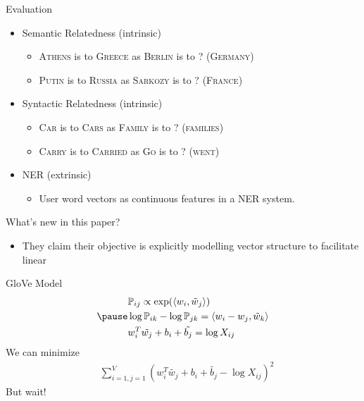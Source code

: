 \begin{frame}{Evaluation}
  \begin{itemize}
  \item Semantic Relatedness (intrinsic)
    \begin{itemize}
    \item \textsc{Athens} is to \textsc{Greece} as \textsc{Berlin} is to ? (\textsc{Germany})
    \item \textsc{Putin} is to \textsc{Russia} as \textsc{Sarkozy} is to ? (\textsc{France})
    \end{itemize}
  \item Syntactic Relatedness (intrinsic)
    \begin{itemize}
    \item \textsc{Car} is to \textsc{Cars} as \textsc{Family} is to ? (\textsc{families})
    \item \textsc{Carry} is to \textsc{Carried} as \textsc{Go} is to ? (\textsc{went})
    \end{itemize}
  \item NER (extrinsic)
    \begin{itemize}
    \item User word vectors as continuous features in a NER system.
    \end{itemize}
  \end{itemize}
\end{frame}

\begin{frame}{What's new in this paper?}
  \begin{itemize}
  \item They claim their objective is explicitly modelling vector structure to facilitate linear 
  \end{itemize}
\end{frame}

\begin{frame}{GloVe Model}
  \begin{align*}
    & \Pr_{ij} \propto \exp(\dotprod{w_i}{\tilde{w}_j}) \\
    \pause
    & \log \Pr_{ik} - \log\Pr_{jk} = \dotprod{w_i -w_j}{\tilde{w}_k}\\
    & w_i^T\tilde{w_j} +b_i + \tilde{b_j} = \log X_{ij} \\
  \end{align*}
  \pause
We can minimize 
  \begin{align*}
    & \text{} \sum_{i=1,j=1}^V \left( w_i^T\tilde{w_j} +b_i + \tilde{b_j} - \log X_{ij} \right)^2
  \end{align*}
  \pause
  But wait!
\end{frame}

